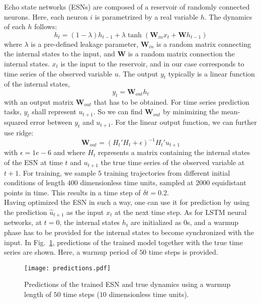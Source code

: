\documentclass{article}
\begin{document}
Echo state networks (ESNs) are composed of a reservoir of randomly connected neurons.
Here, each neuron $i$ is parametrized by a real variable $h$. The dynamics of each $h$
follows:
\begin{equation}
  h_{t} = \left(1-\lambda\right) h_{t-1} + \lambda \tanh\left(\mathbf{W}_{in} x_t + \mathbf{W} h_{t-1}\right)
\end{equation}
where $\lambda$ is a pre-defined leakage parameter, $\mathbf{W}_{in}$ is a random matrix connecting the internal states to the input, and $\mathbf{W}$ is a random matrix connection the internal states.
$x_t$ is the input to the reservoir, and in our case corresponds to time series of the observed variable $u$. The output $y_t$ typically is a linear function of the internal states,
\begin{equation}
  y_t = \mathbf{W}_{out} h_t
\end{equation}
with an output matrix $\mathbf{W}_{out}$ that has to be obtained. For time series prediction tasks,
$y_t$ shall represent $u_{t+1}$.
So we can find $\mathbf{W}_{out}$ by minimizing the mean-squared error between $y_t$ and $u_{t+1}$.
For the linear output function, we can further use ridge:
\begin{equation}
  \mathbf{W}_{out} = \left(H_t' H_t+\epsilon\right)^{-1}H_t'u_{t+1}
\end{equation}
with $\epsilon=1e-6$ and where $H_t$ represents a matrix containing the internal states of the ESN at time $t$ and $u_{t+1}$ the true time series of the observed variable at $t+1$.
For training, we sample $5$ training trajectories from different initial conditions of length $400$ dimensionless time units, sampled at $2000$ equidistant points in time. This results in a time step of $\delta t=0.2$.\\
Having optimized the ESN in such a way, one can use it for prediction by using the prediction $\hat{u}_{t+1}$ as the input $x_t$ at the next time step.
As for LSTM neural networks, at $t=0$, the internal states $h_t$ are initialized as $0$s, and a warmup phase has to be provided for the internal states to become synchronized with the input.
In Fig.~\ref{fig:prediction}, predictions of the trained model together with the true time series are shown.
Here, a warmup period of $50$ time steps is provided.

\begin{figure}[ht]
  \centering
  \texttt{[image: predictions.pdf]}
  \caption{Predictions of the trained ESN and true dynamics using a warmup length of $50$ time steps ($10$ dimensionless time units).}
  \label{fig:prediction}
\end{figure}
\end{document}
